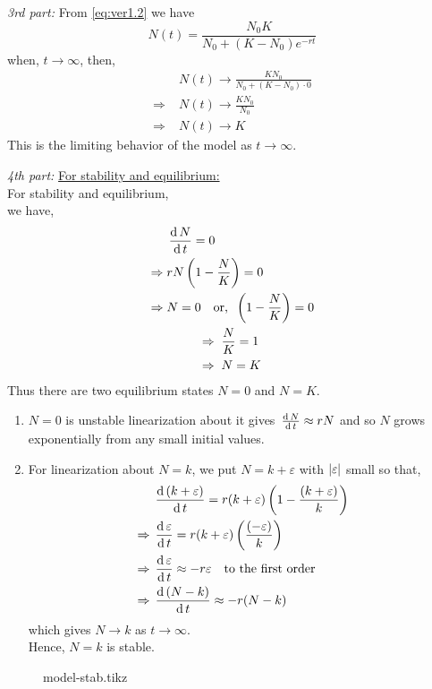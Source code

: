 \documentclass[../main-sheet.tex]{subfiles}
\begin{document}
\begin{soln}
    \emph{3rd part:} From \eqref{eq:ver1.2} we have
    \[N(t)=\frac{N_0K}{N_0+(K-N_0)e^{-rt}}\]
    when, \(t\to \infty\), then,
    \begin{align*}
        & N(t)\to\frac{KN_0}{N_0+(K-N_0)\cdot 0}\\
        \Rightarrow\;& N(t)\to\frac{KN_0}{N_0}\\
        \Rightarrow\;& N(t)\to K
    \end{align*}
    This is the limiting behavior of the model as \(t\to\infty\).
    
    \emph{4th part:} \underline{For stability and equilibrium:}\\
    For stability and equilibrium,\\
    we have,
    \begin{align*}
        &\,\frac{\mathrm{d}\,N}{\mathrm{d}\,t}=0\\
        \Rightarrow\; &rN\left( 1-\frac{N}{K} \right)=0\\
        \Rightarrow\; &N=0\quad\text{or,}\;\;\left( 1-\frac{N}{K} \right)=0\\
        &\qquad\;\;\Rightarrow\;\frac{N}{K}=1\\
        &\qquad\;\;\Rightarrow\;N=K
    \end{align*}
    Thus there are two equilibrium states \(N=0\) and \(N=K\).
    \begin{enumerate}[label=(\roman*)]
        \item \(N=0\) is unstable linearization about it gives \(\,\frac{\mathrm{d}\,N}{\mathrm{d}\,t}\approx rN\) and so \(N\) grows exponentially from any small initial values.
        \item For linearization about \(N=k\),
        we put \(N=k+\varepsilon\) with \(\left\vert\varepsilon\right\vert\) small so that,
        \begin{align*}
            &\,\frac{\mathrm{d}\,(k+\varepsilon)}{\mathrm{d}\,t}=r(k+\varepsilon)\left( 1-\frac{(k+\varepsilon)}{k} \right)\\
            \Rightarrow\;&\,\frac{\mathrm{d}\,\varepsilon}{\mathrm{d}\,t}=r(k+\varepsilon)\left( \frac{(-\varepsilon)}{k} \right)\\
            \Rightarrow\;&\,\frac{\mathrm{d}\,\varepsilon}{\mathrm{d}\,t}\approx -r\varepsilon\quad \text{to the first order}\\
            \Rightarrow\;&\,\frac{\mathrm{d}\,(N-k)}{\mathrm{d}\,t}\approx -r(N-k)
        \end{align*}
        which gives \(N\to k\) as \(t\to \infty\).\\
        Hence, \(N=k\) is stable.
    \end{enumerate}
    \begin{figure}[H]
        \centering
        {model-stab.tikz}
    \end{figure}
\end{soln}
\end{document}
